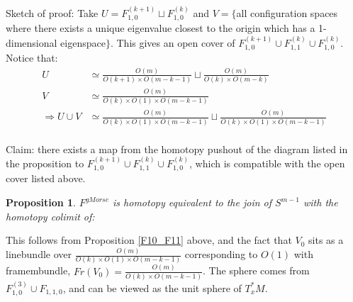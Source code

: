 \documentclass{article}
\newtheorem{proposition}[theorem]{Proposition}
\newtheorem{proposed work}[theorem]{Proposed Work}
\begin{document}
Sketch of proof: Take $U=F_{1,0}^{(k+1)}\sqcup F_{1,0}^{(k)}$ and $V=\lbrace$all configuration spaces where there exists a unique eigenvalue closest to the origin which has a 1-dimensional eigenspace$\rbrace$. This gives an open cover of $F_{1,0}^{(k+1)}\cup F_{1,1}^{(k)}\cup F_{1,0}^{(k)}$.\\

Notice that: 
\begin{align*}
U &\simeq \frac{O(m)}{O(k+1)\times O(m-k-1)}\sqcup \frac{O(m)}{O(k)\times O(m-k)}\\
V &\simeq \frac{O(m)}{O(k)\times O(1)\times O(m-k-1)}\\
\Rightarrow U\cup V &\simeq \frac{O(m)}{O(k)\times O(1)\times O(m-k-1)}\sqcup \frac{O(m)}{O(k)\times O(1)\times O(m-k-1)}\\
\end{align*}

Claim: there exists a map from the homotopy pushout of the diagram listed in the proposition to $F_{1,0}^{(k+1)}\cup F_{1,1}^{(k)}\cup F_{1,0}^{(k)}$, which is compatible with the open cover listed above. 


\begin{proposition}
$F^{gMorse}$ is homotopy equivalent to the join of $S^{m-1}$ with  the homotopy colimit of:\\
\begin{center}
	\end{center}
\end{proposition}
This follows from Proposition \ref{F10_F11} above, and the fact that $V_0$ sits as a linebundle over $\frac{O(m)}{O(k)\times O(1)\times O(m-k-1)}$ corresponding to $O(1)$ with framembundle, $Fr(V_0)=\frac{O(m)}{O(k)\times O(m-k-1)}$. The sphere comes from $F_{1,0}^{(3)}\cup F_{1,1,0}$, and can be viewed as the unit sphere of $T_x^*M$.
\end{document}

